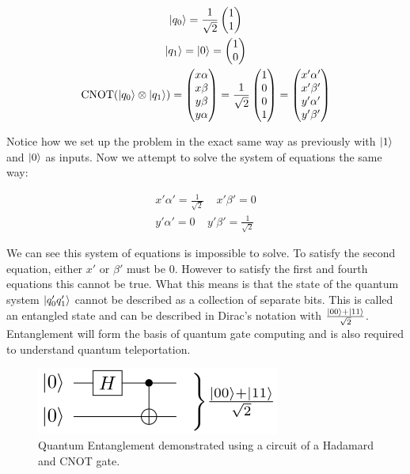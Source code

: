 \documentclass[conference]{IEEEtran}
\begin{document}
\begin{gather*}
\ket{q_0} = \frac{1}{\sqrt{2}}\begin{pmatrix}1\\1\end{pmatrix}\\
\ket{q_1} = \ket{0} = \begin{pmatrix}1\\0\end{pmatrix}\\
\text{CNOT}(\ket{q_0} \otimes \ket{q_1}) =
\begin{pmatrix}x\alpha\\x\beta\\y\beta\\y\alpha\end{pmatrix} =
\frac{1}{\sqrt{2}}\begin{pmatrix}1\\0\\0\\1\end{pmatrix} = \begin{pmatrix}x'\alpha'\\x'\beta'\\y'\alpha'\\y'\beta'\end{pmatrix}
\end{gather*}

Notice how we set up the problem in the exact same way as previously with $\ket{1}$ and $\ket{0}$ as inputs. Now we attempt to solve the system of equations the same way:

\begin{gather*}
x'\alpha' = \frac{1}{\sqrt{2}} \;\;\;\; x'\beta' = 0\\
y'\alpha' = 0 \;\;\;\; y'\beta' = \frac{1}{\sqrt{2}}
\end{gather*}

We can see this system of equations is impossible to solve. To satisfy the second equation, either $x'$ or $\beta'$ must be $0$. However to satisfy the first and fourth equations this cannot be true. What this means is that the state of the quantum system $\ket{q_0'q_1'}$ cannot be described as a collection of separate bits. This is called an entangled state and can be described in Dirac's notation with $\frac{\ket{00}+\ket{11}}{\sqrt{2}}$. Entanglement will form the basis of quantum gate computing and is also required to understand quantum teleportation.

\begin{figure}[htbp]
\centerline{\includegraphics[width=8cm]{entanglement_circuit.png}}
\caption{Quantum Entanglement demonstrated using a circuit of a Hadamard and CNOT gate.}
\label{entanglement}
\end{figure}
\end{document}

